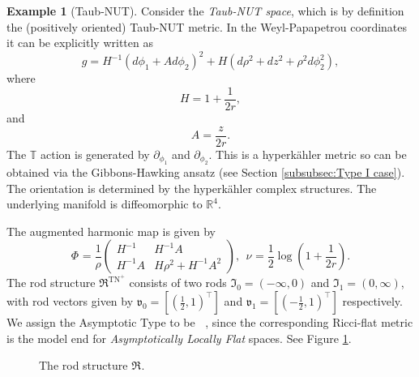 \documentclass[a4paper,11pt]{amsart}
\theoremstyle{definition}
\newtheorem{example}[theorem]{Example}
\numberwithin{equation}{section}
\newcommand{\p}{\partial}
\newcommand{\R}{\mathbb{R}}
\newcommand{\dT}{\mathbb{T}}
\newcommand{\mR} {\mathfrak R}
\DeclareMathOperator{\TN}{TN}
\DeclareMathOperator{\TNp}{TN^+}
\DeclareMathOperator{\ALFp}{ALF^+}
\begin{document}
\begin{example}[Taub-NUT]\label{example:positive Taub-NUT}
    Consider the \emph{Taub-NUT space}, which is by definition the (positively oriented) Taub-NUT metric.  In the {Weyl-Papapetrou} coordinates it can be explicitly written as
	\begin{equation*}
		g=H^{-1}(d\phi_1+{A}d\phi_2)^2+H(d\rho^2+dz^2+\rho^2d\phi_2^2),
	\end{equation*}
    where $$H=1+\frac{1}{2r},$$and $${A}=\frac{z}{2r}.$$ The $\dT$ action is generated by $\p_{\phi_1}$ and $\p_{\phi_2}$. 
    This is a hyperk\"ahler metric so can be obtained via the Gibbons-Hawking ansatz (see Section \ref{subsubsec:Type I case}). The orientation is determined by the hyperk\"ahler complex structures. The underlying manifold is diffeomorphic to $\R^4$.
    
    The augmented  harmonic map is given by 
    \begin{equation}\label{e:standard harmonic map ALF}\Phi^{\TNp}=\frac{1}{\rho}\left(\begin{matrix} H^{-1}  & H^{-1}A\\ H^{-1}A& H\rho^2+H^{-1}A^2\end{matrix}\right), \ \ \nu^{\TNp}=\frac{1}{2}\log(1+\frac{1}{2r}).
    \end{equation}
    The rod structure $\mathfrak{R}^{\TN^{+}}$ consists of two rods $\mathfrak{I}_0=(-\infty,0)$ and $\mathfrak{I}_1=(0,\infty)$, with rod vectors given by  ${\mathfrak{v}}_0=[(\frac{1}{2},1)^{\top}]$ and ${\mathfrak{v}}_1=[(-\frac{1}{2},1)^{\top}]$ respectively. We assign the Asymptotic Type to be $\ALFp$, since the corresponding Ricci-flat metric is the model end  for \emph{Asymptotically Locally Flat} spaces. See Figure \ref{Figure:rod structure for R^TN+}.


    \begin{figure}[ht]
	\caption{The rod structure $\mR^{\TNp}$.}
	 \label{Figure:rod structure for R^TN+}   
    \end{figure}
    \end{example}
    
\end{document}
